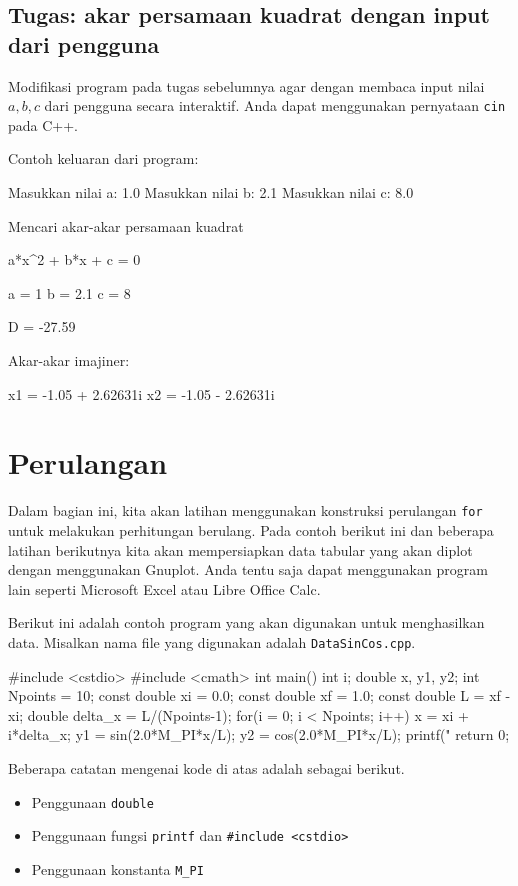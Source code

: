 \documentclass[a4paper,11pt]{extarticle}
\begin{document}
\subsection{Tugas: akar persamaan kuadrat dengan input dari pengguna}

Modifikasi program pada tugas sebelumnya agar dengan membaca input
nilai $a, b, c$ dari pengguna secara interaktif. Anda
dapat menggunakan pernyataan \texttt{cin} pada C++.

Contoh keluaran dari program:
\begin{textcode}
Masukkan nilai a: 1.0
Masukkan nilai b: 2.1
Masukkan nilai c: 8.0

Mencari akar-akar persamaan kuadrat

a*x^2 + b*x + c = 0

a = 1
b = 2.1
c = 8

D = -27.59

Akar-akar imajiner:

x1 = -1.05 + 2.62631i
x2 = -1.05 - 2.62631i
\end{textcode}


\section{Perulangan}
Dalam bagian ini, kita akan latihan menggunakan konstruksi perulangan \texttt{for}
untuk melakukan perhitungan berulang. Pada contoh berikut ini dan beberapa
latihan berikutnya kita akan mempersiapkan data tabular yang akan diplot
dengan menggunakan \textsf{Gnuplot}. Anda tentu saja dapat menggunakan program
lain seperti \textsf{Microsoft Excel} atau \textsf{Libre Office Calc}.

Berikut ini adalah contoh program yang akan digunakan untuk menghasilkan data.
Misalkan nama file yang digunakan adalah \texttt{DataSinCos.cpp}.
\begin{cppcode}
#include <cstdio>
#include <cmath>
int main()
{
  int i;
  double x, y1, y2;
  int Npoints = 10;
  const double xi = 0.0;
  const double xf = 1.0;
  const double L = xf - xi;
  double delta_x = L/(Npoints-1);
  for(i = 0; i < Npoints; i++) {
    x = xi + i*delta_x;
    y1 = sin(2.0*M_PI*x/L);
    y2 = cos(2.0*M_PI*x/L);
    printf("%
  }
  return 0;
}
\end{cppcode}

Beberapa catatan mengenai kode di atas adalah sebagai berikut.
\begin{itemize}
\item Penggunaan \texttt{double}
\item Penggunaan fungsi \texttt{printf} dan \texttt{\#include <cstdio>}
\item Penggunaan konstanta \verb|M_PI|
\end{itemize}
\end{document}
